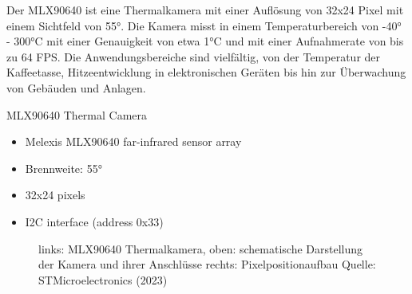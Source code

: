 \documentclass[
  11pt,
  a4paper,
  oneside, openany  ,captions=tableheading
]{scrbook}
\providecommand{\tightlist}{%
  \setlength{\itemsep}{0pt}\setlength{\parskip}{0pt}}
\theoremstyle{remark}
\renewcommand{\markright}[1]{\def\chaptertitle{#1}} %
\begin{document}
\markright{MLX90640 Thermalkamera\index{MLX90640}}

Der MLX90640 ist eine Thermalkamera mit einer Auflösung von 32x24 Pixel
mit einem Sichtfeld von 55°. Die Kamera misst in einem Temperaturbereich
von -40° - 300°C mit einer Genauigkeit von etwa 1°C und mit einer
Aufnahmerate von bis zu 64 FPS. Die Anwendungsbereiche sind vielfältig,
von der Temperatur der Kaffeetasse, Hitzeentwicklung in elektronischen
Geräten bis hin zur Überwachung von Gebäuden und Anlagen.

MLX90640 Thermal Camera

\begin{itemize}
\tightlist
\item
  Melexis MLX90640 far-infrared sensor array
\item
  Brennweite: 55°
\item
  32x24 pixels
\item
  I2C interface (address 0x33)
\end{itemize}

\begin{figure}


\caption{\label{fig-MLX90640}links: MLX90640 Thermalkamera, oben:
schematische Darstellung der Kamera und ihrer Anschlüsse rechts:
Pixelpositionaufbau Quelle: STMicroelectronics (2023)}

\end{figure}%
\end{document}
